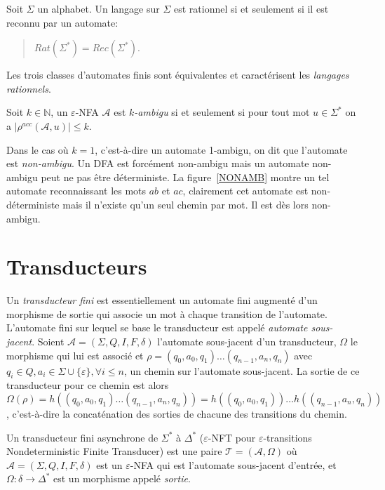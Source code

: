 	\begin{theorem}[Kleene]
		Soit $\Sigma$ un alphabet. Un langage sur $\Sigma$ est rationnel si et seulement si il est reconnu par un automate: 
		\begin{quotation}
			$Rat(\Sigma^*) = Rec(\Sigma^*)$.
		\end{quotation}
	\end{theorem}
	 
	Les trois classes d'automates finis sont équivalentes et caractérisent les \emph{langages rationnels}. \\

	\begin{definition}
		Soit $k \in \mathbb{N}$, un $\varepsilon$-NFA $\mathscr{A}$ est \emph{$k$-ambigu} si et seulement si pour tout mot $u \in \Sigma^*$ on a $|\rho^{acc}(\mathscr{A},u)| \leq k$.
	\end{definition}

	Dans le cas où $k=1$, c'est-à-dire un automate 1-ambigu, on dit que l'automate est \emph{non-ambigu}. Un DFA est forcément non-ambigu mais un automate non-ambigu peut ne pas être déterministe. La figure~\ref{NONAMB} montre un tel automate reconnaissant les mots $ab$ et $ac$, clairement cet automate est non-déterministe mais il n'existe qu'un seul chemin par mot. Il est dès lors non-ambigu.
	
	
	
\section{Transducteurs}
\label{trans}
  
    Un \emph{transducteur fini} est essentiellement un automate fini augmenté d'un morphisme de sortie qui associe un mot à chaque transition de l'automate. L'automate fini sur lequel se base le transducteur est appelé \emph{automate sous-jacent}. Soient $\mathscr{A} = (\Sigma,Q,I,F,\delta)$ l'automate sous-jacent d'un transducteur, $\Omega$ le morphisme qui lui est associé et $\rho = (q_0,a_0,q_1)\ldots(q_{n-1},a_n,q_n)$ avec $q_i \in Q, a_i \in \Sigma \cup \{\varepsilon\}, \forall i \leq n$, un chemin sur l'automate sous-jacent. La sortie de ce transducteur pour ce chemin est alors $\Omega(\rho) = h( (q_0,a_0,q_1)\ldots(q_{n-1},a_n,q_n)) = h((q_0,a_0,q_1))\ldots h((q_{n-1},a_n,q_n))$, c'est-à-dire la concaténation des sorties de chacune des transitions du chemin. \\
    
    \begin{definition}
		Un transducteur fini asynchrone de $\Sigma^*$ à $\Delta^*$ ($\varepsilon$-NFT pour $\varepsilon$-transitions Nondeterministic Finite Transducer) est une paire $\mathscr{T} = (\mathscr{A}, \Omega)$ où $\mathscr{A} = (\Sigma,Q,I,F,\delta)$ est un $\varepsilon$-NFA qui est l'automate sous-jacent d'entrée, et $\Omega:\delta \to \Delta^*$ est un morphisme appelé \emph{sortie}.
	\end{definition}

